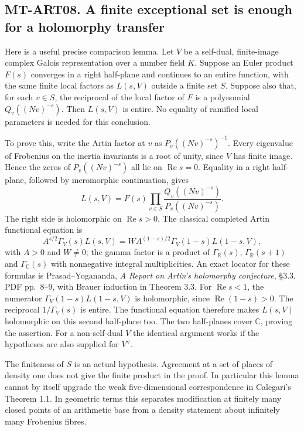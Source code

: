 \documentclass[11pt,a4paper]{article}
\begin{document}
\subsection*{MT-ART08. A finite exceptional set is enough for a holomorphy transfer}
Here is a useful precise comparison lemma. Let $V$ be a self-dual,
finite-image complex Galois representation over a number field $K$.
Suppose an Euler product $F(s)$ converges in a right half-plane and
continues to an entire function, with the same finite local factors as $L(s,V)$ outside a
finite set $S$. Suppose also that, for each $v\in S$, the reciprocal of
the local factor of $F$ is a polynomial $Q_v((Nv)^{-s})$.
Then $L(s,V)$ is entire. No equality of ramified local parameters is
needed for this conclusion.

To prove this, write the Artin factor at $v$ as
$P_v((Nv)^{-s})^{-1}$. Every eigenvalue of Frobenius on the inertia
invariants is a root of unity, since $V$ has finite image. Hence the zeros
of $P_v((Nv)^{-s})$ all lie on $\operatorname{Re}s=0$.
Equality in a right half-plane, followed by meromorphic continuation,
gives
\[
 L(s,V)=F(s)\prod_{v\in S}
             \frac{Q_v((Nv)^{-s})}{P_v((Nv)^{-s})}.
\]
The right side is holomorphic on $\operatorname{Re}s>0$.
The classical completed Artin functional equation is
\[
 A^{s/2}\Gamma_V(s)L(s,V)
   =W A^{(1-s)/2}\Gamma_V(1-s)L(1-s,V),
\]
with $A>0$ and $W\ne0$; the gamma factor is a product of
$\Gamma_{\mathbb R}(s)$, $\Gamma_{\mathbb R}(s+1)$ and
$\Gamma_{\mathbb C}(s)$ with nonnegative integral multiplicities.
An exact locator for these formulas is Prasad--Yogananda,
\emph{A Report on Artin's holomorphy conjecture}, \S3.3,
PDF pp.~8--9, with Brauer induction in Theorem 3.3.
For $\operatorname{Re}s<1$, the numerator
$\Gamma_V(1-s)L(1-s,V)$ is holomorphic, since
$\operatorname{Re}(1-s)>0$. The reciprocal $1/\Gamma_V(s)$ is entire.
The functional equation therefore makes $L(s,V)$ holomorphic on this
second half-plane too. The two half-planes cover $\mathbb C$, proving
the assertion. For a non-self-dual $V$ the identical argument works if
the hypotheses are also supplied for $V^\vee$.

The finiteness of $S$ is an actual hypothesis. Agreement at a set of
places of density one does not give the finite product in the proof.
In particular this lemma cannot by itself upgrade the weak
five-dimensional correspondence in Calegari's Theorem 1.1.
In geometric terms this separates modification at finitely many closed
points of an arithmetic base from a density statement about infinitely
many Frobenius fibres.
\end{document}
